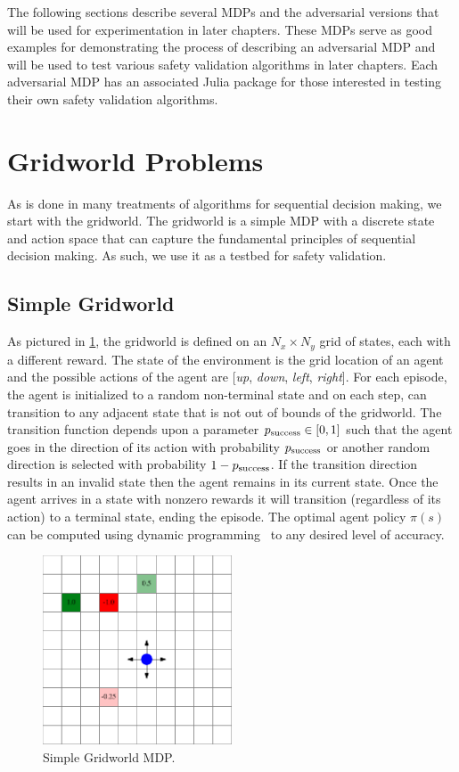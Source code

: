 The following sections describe several MDPs and the adversarial versions that will be used for experimentation in later chapters. These MDPs serve as good examples for demonstrating the process of describing an adversarial MDP and will be used to test various safety validation algorithms in later chapters. Each adversarial MDP has an associated Julia package for those interested in testing their own safety validation algorithms. 

\section{Gridworld Problems}
As is done in many treatments of algorithms for sequential decision making, we start with the gridworld. The gridworld is a simple MDP with a discrete state and action space that can capture the fundamental principles of sequential decision making. As such, we use it as a testbed for safety validation.

\subsection{Simple Gridworld}
As pictured in \cref{fig:simple_gridworld}, the gridworld is defined on an $N_x \times N_y$ grid of states, each with a different reward.  The state of the environment is the grid location of an agent and the possible actions of the agent are [\emph{up}, \emph{down}, \emph{left}, \emph{right}]. For each episode, the agent is initialized to a random non-terminal state and on each step, can transition to any adjacent state that is not out of bounds of the gridworld. The transition function depends upon a parameter $p_{\rm success} \in [0,1]$ such that the agent goes in the direction of its action with probability $p_{\rm success}$ or another random direction is selected with probability $1-p_{\rm success}$. If the transition direction results in an invalid state then the agent remains in its current state. Once the agent arrives in a state with nonzero rewards it will transition (regardless of its action) to a terminal state, ending the episode. The optimal agent policy $\pi(s)$ can be computed using dynamic programming~\cite{dmubook} to any desired level of accuracy. 

\begin{figure}
    \centering
    \includegraphics[width=0.5\textwidth]{figures/sample_systems/simple_gridworld.pdf}
    \caption{Simple Gridworld MDP.}
    \label{fig:simple_gridworld}
\end{figure}

